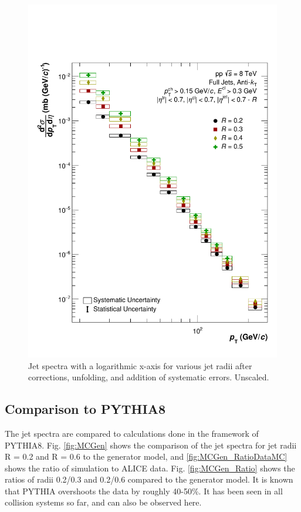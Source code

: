 \documentclass[ALICE]{ALICE_analysis_notes}
\begin{document}
\begin{figure}
    \centering
    \includegraphics[width=15cm]{figures/FinalResults/Bayes_reg6_logx_unscaled.pdf}
    \caption{Jet spectra with a logarithmic x-axis for various jet radii after corrections, unfolding, and addition of systematic errors. Unscaled.}
    \label{fig:finalSpectraUnscaledLogX}
\end{figure}

\subsection{Comparison to PYTHIA8}
\label{sec:mcComparison}

The jet spectra are compared to calculations done in the framework of PYTHIA8.
Fig. \ref{fig:MCGen} shows the comparison of the jet spectra for jet radii R = 0.2 and R = 0.6 to the generator model, and \ref{fig:MCGen_RatioDataMC} shows the ratio of simulation to ALICE data. Fig. \ref{fig:MCGen_Ratio} shows the ratios of radii 0.2/0.3 and 0.2/0.6 compared to the generator model. It is known that PYTHIA overshoots the data by roughly 40-50\%. It has been seen in all collision systems so far, and can also be observed here.
\end{document}
